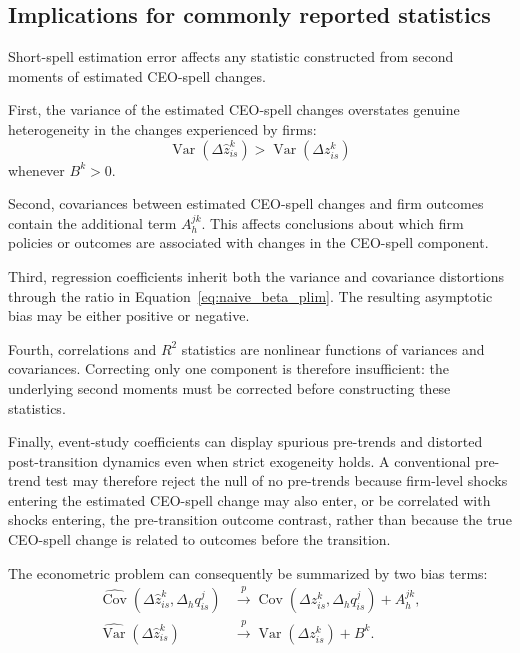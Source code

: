 \documentclass[11pt,a4paper]{article}
\begin{document}
\subsection{Implications for commonly reported statistics}
\label{subsec:implications}

Short-spell estimation error affects any statistic constructed from
second moments of estimated CEO-spell changes.

First, the variance of the estimated CEO-spell changes overstates
genuine heterogeneity in the changes experienced by firms:
\[
\operatorname{Var}\!\left(
\Delta\widehat z_{is}^{k}
\right)
>
\operatorname{Var}\!\left(
\Delta z_{is}^{k}
\right)
\]
whenever $B^{k}>0$.

Second, covariances between estimated CEO-spell changes and firm
outcomes contain the additional term $A_h^{jk}$. This affects
conclusions about which firm policies or outcomes are associated with
changes in the CEO-spell component.

Third, regression coefficients inherit both the variance and
covariance distortions through the ratio in
Equation~\eqref{eq:naive_beta_plim}. The resulting asymptotic bias may
be either positive or negative.

Fourth, correlations and $R^2$ statistics are nonlinear functions of
variances and covariances. Correcting only one component is therefore
insufficient: the underlying second moments must be corrected before
constructing these statistics.

Finally, event-study coefficients can display spurious pre-trends and distorted post-transition dynamics even when strict exogeneity holds. A conventional pre-trend test may therefore reject the null of no pre-trends because firm-level shocks entering the estimated CEO-spell change may also enter, or be correlated with shocks entering, the pre-transition outcome contrast, rather than because the true CEO-spell change is related to outcomes before the transition.

The econometric problem can consequently be summarized by two bias
terms:
\begin{align}
\widehat{\operatorname{Cov}}\!\left(
\Delta\widehat z_{is}^{k},
\Delta_h q_{is}^{j}
\right)
&\overset{p}{\longrightarrow}
\operatorname{Cov}\!\left(
\Delta z_{is}^{k},
\Delta_h q_{is}^{j}
\right)
+
A_h^{jk},
\nonumber\\[4pt]
\widehat{\operatorname{Var}}\!\left(
\Delta\widehat z_{is}^{k}
\right)
&\overset{p}{\longrightarrow}
\operatorname{Var}\!\left(
\Delta z_{is}^{k}
\right)
+
B^{k}.
\label{eq:bias_summary}
\end{align}
\end{document}
